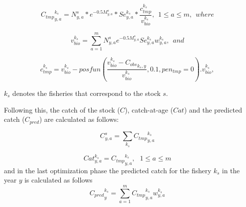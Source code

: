 \documentclass{article}
\begin{document}
\begin{equation}
{C_{tmp}}^{k_s}_{y,a}=N^s_{y,a}*e^{-0.5M^s_{y,a}}* Se_{y,a}^{k_s}* \dfrac{c_{tmp}^{k_s}}{v_{bio}^{k_s}}, \ \  1\leq a \leq m, \ \ where
\end{equation}

\begin{equation}
v_{bio}^{k_s}=\sum_{a=1}^mN^s_{y,a}e^{-0.5M^s_{y,a}} Se_{y,a}^{k_s} w_{y,a}^{k_s}, \ \ and 
\end{equation}
    

\begin{equation}
c_{tmp}^{k_s} = v_{bio}^{k_s}-posfun\left(\frac{v_{bio}^{k_s} - {C_{obs}}_{k_s,y}}{v_{bio}^{k_s}} , 0.1 , pen_{tmp}=0 \right).v_{bio}^{k_s},
\end{equation}

 $k_s$ denotes the fisheries that correspond to the stock $s$.


Following this, the catch of the stock ($C$), catch-at-age ($Cat$) and the predicted catch ($C_{pred}$) are calculated as follows:

\begin{equation}
C^s_{y,a}=\sum_{k_s}{C_{tmp}}^{k_s}_{y,a} 
\end{equation}

\begin{equation}
Cat^{k_s}_{y,a}={C_{tmp}}^{k_s}_{y,a},  \  \  \ 1\leq a \leq m
\end{equation}
and in the last optimization phase the predicted catch for the fishery $k_s$ in the year $y$ is calculated as follows 
\begin{equation}
{C_{pred}}^{k_s}_y=\sum_{a=1}^{m}{C_{tmp}}^{k_s}_{y,a} w_{y,a}^{k_s}
\end{equation} 
\end{document}
